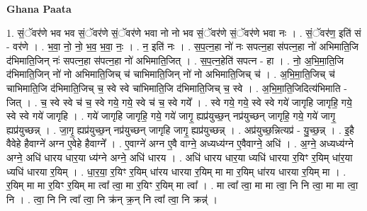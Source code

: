 \documentclass[17pt]{extarticle}
\begin{document}
\textbf{Ghana Paata } \newline

1. सं॒ॅवर॑णे भव भव सं॒ॅवर॑णे सं॒ॅवर॑णे भवा नो नो भव सं॒ॅवर॑णे सं॒ॅवर॑णे भवा नः । . सं॒ॅवर॑ण॒ इति॑ सं - वर॑णे । . भ॒वा॒ नो॒ नो॒ भ॒व॒ भ॒वा॒ नः॒ । . न॒ इति॑ नः । . स॒प॒त्न॒हा नो॑ नः सपत्न॒हा स॑पत्न॒हा नो॑ अभिमाति॒जि द॑भिमाति॒जिन् नः॑ सपत्न॒हा स॑पत्न॒हा नो॑ अभिमाति॒जित् । . स॒प॒त्न॒हेति॑ सपत्न - हा । . नो॒ अ॒भि॒मा॒ति॒जि द॑भिमाति॒जिन् नो॑ नो अभिमाति॒जिच् च॑ चाभिमाति॒जिन् नो॑ नो अभिमाति॒जिच् च॑ । . अ॒भि॒मा॒ति॒जिच् च॑ चाभिमाति॒जि द॑भिमाति॒जिच् च॒ स्वे स्वे चा॑भिमाति॒जि द॑भिमाति॒जिच् च॒ स्वे । . अ॒भि॒मा॒ति॒जिदित्य॑भिमाति - जित् । . च॒ स्वे स्वे च॑ च॒ स्वे गये॒ गये॒ स्वे च॑ च॒ स्वे गये᳚ । . स्वे गये॒ गये॒ स्वे स्वे गये॑ जागृहि जागृहि॒ गये॒ स्वे स्वे गये॑ जागृहि । . गये॑ जागृहि जागृहि॒ गये॒ गये॑ जागृ॒ ह्यप्र॑युच्छ॒न् नप्र॑युच्छन् जागृहि॒ गये॒ गये॑ जागृ॒ ह्यप्र॑युच्छन्न् । . जा॒गृ॒ ह्यप्र॑युच्छ॒न् नप्र॑युच्छन् जागृहि जागृ॒ ह्यप्र॑युच्छन्न् । . अप्र॑युच्छ॒न्नित्यप्र॑ - यु॒च्छ॒न्न् । . इ॒है वैवेहे हैवाग्ने॑ अग्न ए॒वेहे हैवाग्ने᳚ । . ए॒वाग्ने॑ अग्न ए॒वै वाग्ने॒ अध्यध्य॑ग्न ए॒वैवाग्ने॒ अधि॑ । . अ॒ग्ने॒ अध्यध्य॑ग्ने अग्ने॒ अधि॑ धारय धार॒या ध्य॑ग्ने अग्ने॒ अधि॑ धारय । . अधि॑ धारय धार॒या ध्यधि॑ धारया र॒यिꣳ र॒यिम् धा॑र॒या ध्यधि॑ धारया र॒यिम् । . धा॒र॒या॒ र॒यिꣳ र॒यिम् धा॑रय धारया र॒यिम् मा मा र॒यिम् धा॑रय धारया र॒यिम् मा । . र॒यिम् मा मा र॒यिꣳ र॒यिम् मा त्वा᳚ त्वा॒ मा र॒यिꣳ र॒यिम् मा त्वा᳚ । . मा त्वा᳚ त्वा॒ मा मा त्वा॒ नि नि त्वा॒ मा मा त्वा॒ नि । . त्वा॒ नि नि त्वा᳚ त्वा॒ नि क्र॑न् क्र॒न् नि त्वा᳚ त्वा॒ नि क्रन्न्॑ । \newline
\end{document}
